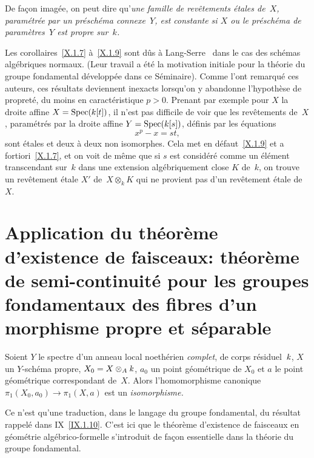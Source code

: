 De fa\c con imag\'ee, on peut dire qu'\emph{une famille de
revêtements étales de~$X$, paramétrée par un
préschéma connexe~$Y$, est constante si $X$ ou le
préschéma de paramètres~$Y$ est propre sur~$k$.}

\begin{remarques}
\label{X.1.10}
Les corollaires~\ref{X.1.7} \`a~\ref{X.1.9} sont d\^us \`a
Lang-Serre~\cite{X.2} dans le cas des sch\'emas alg\'ebriques normaux.
(Leur travail a \'et\'e la motivation initiale pour la th\'eorie
du groupe fondamental d\'evelopp\'ee dans ce S\'eminaire). Comme
l'ont remarqu\'e ces auteurs, ces r\'esultats deviennent inexacts
lorsqu'on y abandonne l'hypoth\`ese de propret\'e, du moins en
caract\'eristique $p>0$. Prenant par exemple pour $X$ la droite
affine $X=\operatorname{Spec}(k[t])$, il n'est pas difficile de voir que les
rev\^etements de~$X$, param\'etr\'es par la droite affine
$Y=\operatorname{Spec}(k[s])$, d\'efinis par les \'equations
$$
x^p - x = st,
$$
sont \'etales et deux \`a deux non isomorphes. Cela met en
d\'efaut~\ref{X.1.9} et a fortiori~\ref{X.1.7}, et on voit de
m\^eme que si $s$ est consid\'er\'e comme un \'el\'ement
transcendant sur~$k$ dans une extension alg\'ebriquement close $K$
de~$k$, on trouve un rev\^etement \'etale $X'$ de~$X\otimes_kK$
qui ne provient pas d'un rev\^etement \'etale de~$X$.
\end{remarques}

\section[Application du th\'eor\`eme d'existence de faisceaux]{Application du th\'eor\`eme d'existence de faisceaux:
th\'eo\-r\`eme de semi-con\-ti\-nu\-i\-t\'e pour les groupes
fondamentaux des fibres d'un morphisme propre et s\'eparable}
\label{X.2}

\begin{theoreme}
\label{X.2.1}
Soient $Y$ le spectre d'un anneau local noeth\'erien
\emph{complet}, de corps r\'esiduel~$\mathit{k}$, $X$ un $Y$-sch\'ema
propre, $X_0=X\otimes_A \mathit{k}$, $a_0$ un point g\'eom\'etrique de
$X_0$ et $a$ le point g\'eom\'etrique correspondant de~$X$. Alors
l'homomorphisme canonique $\pi_1(X_0,a_0)\to \pi_1(X,a)$ est un
\emph{isomorphisme.}
\end{theoreme}

Ce n'est qu'une traduction, dans le langage du groupe fondamental, du
r\'esultat rappel\'e dans IX~\ref{IX.1.10}. C'est ici que le
th\'eor\`eme d'existence
de
faisceaux en g\'eom\'etrie
alg\'ebrico-formelle s'introduit de fa\c con essentielle dans la
th\'eorie du groupe fondamental.


